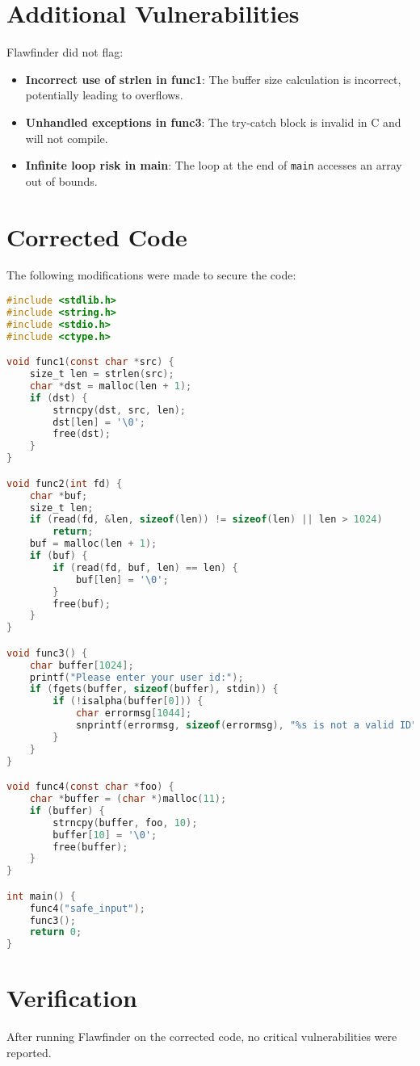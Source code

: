 \documentclass[a4paper,10pt]{article}
\begin{document}
\section{Additional Vulnerabilities}
Flawfinder did not flag:
\begin{itemize}
    \item \textbf{Incorrect use of strlen in func1}: The buffer size calculation is incorrect, potentially leading to overflows.
    \item \textbf{Unhandled exceptions in func3}: The try-catch block is invalid in C and will not compile.
    \item \textbf{Infinite loop risk in main}: The loop at the end of \texttt{main} accesses an array out of bounds.
\end{itemize}

\section{Corrected Code}
The following modifications were made to secure the code:
\begin{lstlisting}[language=C]
#include <stdlib.h>
#include <string.h>
#include <stdio.h>
#include <ctype.h>

void func1(const char *src) {
    size_t len = strlen(src);
    char *dst = malloc(len + 1);
    if (dst) {
        strncpy(dst, src, len);
        dst[len] = '\0';
        free(dst);
    }
}

void func2(int fd) {
    char *buf;
    size_t len;
    if (read(fd, &len, sizeof(len)) != sizeof(len) || len > 1024)
        return;
    buf = malloc(len + 1);
    if (buf) {
        if (read(fd, buf, len) == len) {
            buf[len] = '\0';
        }
        free(buf);
    }
}

void func3() {
    char buffer[1024];
    printf("Please enter your user id:");
    if (fgets(buffer, sizeof(buffer), stdin)) {
        if (!isalpha(buffer[0])) {
            char errormsg[1044];
            snprintf(errormsg, sizeof(errormsg), "%s is not a valid ID", buffer);
        }
    }
}

void func4(const char *foo) {
    char *buffer = (char *)malloc(11);
    if (buffer) {
        strncpy(buffer, foo, 10);
        buffer[10] = '\0';
        free(buffer);
    }
}

int main() {
    func4("safe_input");
    func3();
    return 0;
}
\end{lstlisting}

\section{Verification}
After running Flawfinder on the corrected code, no critical vulnerabilities were reported.
\end{document}
